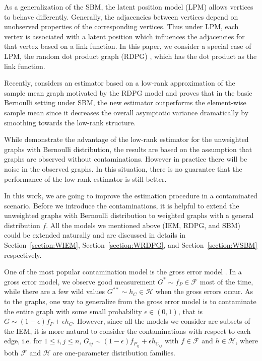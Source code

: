 \documentclass[a4paper]{article}
\begin{document}
As a generalization of the SBM, the latent position model (LPM) \citep{hoff2002latent} allows vertices to behave differently. Generally, the adjacencies between vertices depend on unobserved properties of the corresponding vertices. Thus under LPM, each vertex is associated with a latent position which influences the adjacencies for that vertex based on a link function. In this paper, we consider a special case of LPM, the random dot product graph (RDPG) \citep{young2007random, nickel2007random}, which has the dot product as the link function.

Recently, \citet{tang2016law} considers an estimator based on a low-rank approximation of the sample mean graph motivated by the RDPG model and proves that in the basic Bernoulli setting under SBM, the new estimator outperforms the element-wise sample mean since it decreases the overall asymptotic variance dramatically by smoothing towards the low-rank structure.

While \citet{tang2016law} demonstrate the advantage of the low-rank estimator for the unweighted graphs with Bernoulli distribution, the results are based on the assumption that graphs are observed without contaminations. However in practice there will be noise in the observed graphs. In this situation, there is no guarantee that the performance of the low-rank estimator is still better.

In this work, we are going to improve the estimation procedure in a contaminated scenario. Before we introduce the contaminations, it is helpful to extend the unweighted graphs with Bernoulli distribution to weighted graphs with a general distribution $f$. All the models we mentioned above (IEM, RDPG, and SBM) could be extended naturally and are discussed in details in Section~\ref{section:WIEM}, Section~\ref{section:WRDPG}, and Section~\ref{section:WSBM} respectively.

One of the most popular contamination model is the gross error model \citep{AIC:AIC690280519, bickel2001mathematical}. In a gross error model, we observe good measurement $G^* \sim f_P \in \mathcal{F}$ most of the time, while there are a few wild values $G^{**} \sim h_C \in \mathcal{H}$ when the gross errors occur.
As to the graphs, one way to generalize from the gross error model is to contaminate the entire graph with some small probability $\epsilon \in (0, 1)$, that is $G \sim (1-\epsilon) f_P + \epsilon h_C$. However, since all the models we consider are subsets of the IEM, it is more natural to consider the contaminations with respect to each edge, i.e. for $1 \le i, j \le n$, $G_{ij} \sim (1-\epsilon) f_{P_{ij}} + \epsilon h_{C_{ij}}$ with $f \in \mathcal{F}$ and $h \in \mathcal{H}$, where both $\mathcal{F}$ and $\mathcal{H}$ are one-parameter distribution families.
\end{document}
